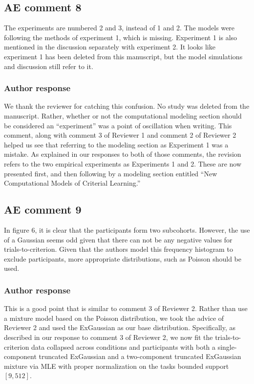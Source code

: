 \documentclass[12pt]{article}
\begin{document}
\subsection{AE comment 8}
The experiments are numbered 2 and 3, instead of 1 and 2.
The models were following the methods of experiment 1, which
is missing. Experiment 1 is also mentioned in the discussion
separately with experiment 2. It looks like experiment 1 has
been deleted from this manuscript, but the model simulations
and discussion still refer to it.

\subsubsection{Author response}
We thank the reviewer for catching this confusion. No study
was deleted from the manuscript. Rather, whether or not the
computational modeling section should be considered an
``experiment'' was a point of oscillation when writing. This
comment, along with comment 3 of Reviewer 1 and comment 2 of
Reviewer 2 helped us see that referring to the modeling
section as Experiment 1 was a mistake. As explained in our
responses to both of those comments, the revision refers to
the two empirical experiments as Experiments 1 and 2. These
are now presented first, and then following by a modeling
section entitled ``New Computational Models of Criterial
Learning.''

\subsection{AE comment 9}
In figure 6, it is clear that the participants form two
subcohorts. However, the use of a Gaussian seems odd given
that there can not be any negative values for
trials-to-criterion. Given that the authors model this
frequency histogram to exclude participants, more
appropriate distributions, such as Poisson should be used.

\subsubsection{Author response}
This is a good point that is similar to comment 3 of
Reviewer 2. Rather than use a mixture model based on the
Poisson distribution, we took the advice of Reviewer 2 and
used the ExGaussian as our base distribution. Specifically,
as described in our response to comment 3 of Reviewer 2, we
now fit the trials-to-criterion data collapsed across
conditions and participants with both a single-component
truncated ExGaussian and a two-component truncated
ExGaussian mixture via MLE with proper normalization on the
tasks bounded support $[9,512]$.
\end{document}
